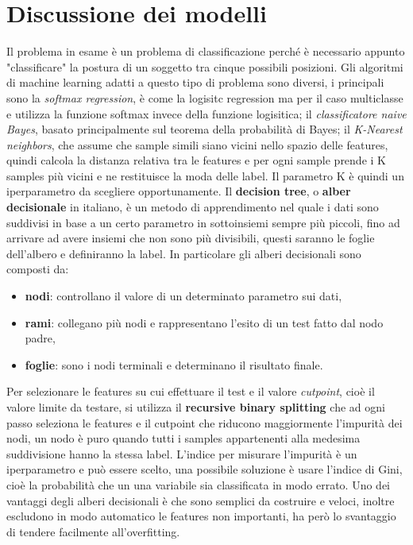 \section{Discussione dei modelli}\label{sec:modelli}
Il problema in esame è un problema di classificazione perché è necessario appunto "classificare" la postura di un soggetto tra cinque possibili posizioni. Gli algoritmi di machine learning adatti a questo tipo di problema sono diversi, i principali sono la \textit{softmax regression},  è come la logisitc regression ma per il caso multiclasse e utilizza la funzione softmax invece della funzione logisitica; il \textit{classificatore naive Bayes}, basato principalmente sul teorema della probabilità di Bayes; il \textit{K-Nearest neighbors}, che assume che sample simili siano vicini nello spazio delle features, quindi calcola la distanza relativa tra le features e per ogni sample prende i K samples più vicini e ne restituisce la moda delle label. Il parametro K è quindi un iperparametro da scegliere opportunamente. Il \textbf{decision tree}, o \textbf{alber decisionale} in italiano, è un metodo di apprendimento nel quale i dati sono suddivisi in base a un certo parametro in sottoinsiemi sempre più piccoli, fino ad arrivare ad avere insiemi che non sono più divisibili, questi saranno le foglie dell'albero e definiranno la label. In particolare gli alberi decisionali sono composti da:
\begin{itemize}
\item \textbf{nodi}: controllano il valore di un determinato parametro sui dati,
\item \textbf{rami}: collegano più nodi e rappresentano l'esito di un test fatto dal nodo padre,
\item \textbf{foglie}: sono i nodi terminali e determinano il risultato finale.
\end{itemize}

Per selezionare le features su cui effettuare il test e il valore \textit{cutpoint}, cioè il valore limite da testare, si utilizza il \textbf{recursive binary splitting} che ad ogni passo seleziona le features e il cutpoint che riducono maggiormente l'impurità dei nodi, un nodo è puro quando tutti i samples appartenenti alla medesima suddivisione hanno la stessa label.  L'indice per misurare l'impurità è un iperparametro e può essere scelto, una possibile soluzione è usare l'indice di Gini, cioè la probabilità che un una variabile sia classificata in modo errato. Uno dei vantaggi degli alberi decisionali è che sono semplici da costruire e veloci, inoltre escludono in modo automatico le features non importanti, ha però lo svantaggio di tendere facilmente all'overfitting. 


